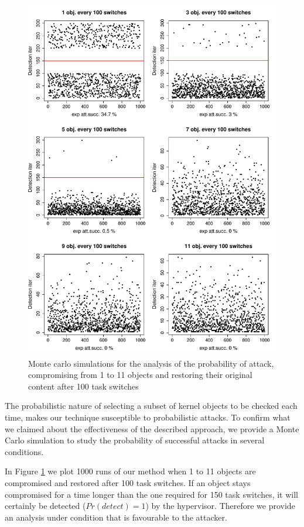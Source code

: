 \begin{figure}[htbp]
\begin{center}
\includegraphics[width=130mm]{images/hr_sim_1000}
\caption{{Monte carlo simulations for the analysis of the probability of attack, compromising from 1 to 11 objects and restoring their original content after 100 task switches}}
\label{monteanalysis}
\end{center}
\end{figure}

The probabilistic nature of selecting a subset of kernel objects to be checked each time, makes our technique susceptible to probabilistic attacks. 
To confirm what we claimed about the effectiveness of the described approach, we provide a Monte Carlo simulation to study the probability of successful attacks in several conditions. 

In Figure \ref{monteanalysis} we plot 1000 runs of our method when 1 to 11 objects are compromised and restored after 100 task switches. If an object stays compromised for a time longer than the one required for 150 task switches, it will certainly be detected ($Pr(detect)=1$) by the hypervisor. Therefore we provide an analysis under condition that is favourable to the attacker.  

